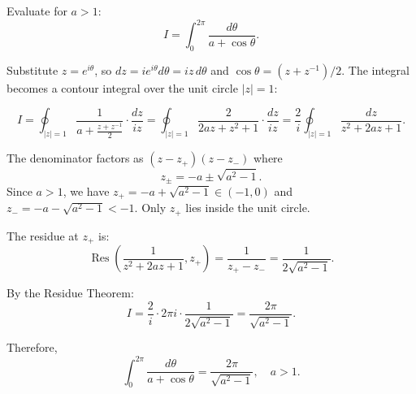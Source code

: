 \begin{example}
  Evaluate for $a > 1$:
  \[
    I = \int_0^{2\pi} \frac{d\theta}{a + \cos\theta}.
  \]

  Substitute $z = e^{i\theta}$, so $dz = ie^{i\theta} d\theta = iz \, d\theta$ and $\cos\theta = (z + z^{-1})/2$.
  The integral becomes a contour integral over the unit circle $|z| = 1$:

  \begin{center}
  \end{center}
  \[
    I = \oint_{|z|=1} \frac{1}{a + \frac{z + z^{-1}}{2}} \cdot \frac{dz}{iz} = \oint_{|z|=1} \frac{2}{2az + z^2 + 1} \cdot \frac{dz}{iz} = \frac{2}{i} \oint_{|z|=1} \frac{dz}{z^2 + 2az + 1}.
  \]

  The denominator factors as $(z - z_+)(z - z_-)$ where
  \[
    z_{\pm} = -a \pm \sqrt{a^2 - 1}.
  \]
  Since $a > 1$, we have $z_+ = -a + \sqrt{a^2 - 1} \in (-1, 0)$ and $z_- = -a - \sqrt{a^2 - 1} < -1$.
  Only $z_+$ lies inside the unit circle.

  The residue at $z_+$ is:
  \[
    \operatorname{Res}\left( \frac{1}{z^2 + 2az + 1}, z_+ \right) = \frac{1}{z_+ - z_-} = \frac{1}{2\sqrt{a^2 - 1}}.
  \]

  By the Residue Theorem:
  \[
    I = \frac{2}{i} \cdot 2\pi i \cdot \frac{1}{2\sqrt{a^2 - 1}} = \frac{2\pi}{\sqrt{a^2 - 1}}.
  \]

  Therefore,
  \[
    \boxed{\int_0^{2\pi} \frac{d\theta}{a + \cos\theta} = \frac{2\pi}{\sqrt{a^2 - 1}}, \quad a > 1.}
  \]
\end{example}

